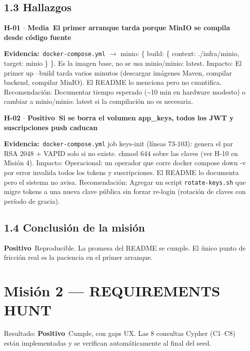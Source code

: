 \documentclass[10pt,a4paper]{article}
\newcommand{\code}[1]{\nolinkurl{#1}}
\newcommand{\badgeMedia}{\colorbox{yellow!35}{\textcolor{brown!90!black}{\textbf{\footnotesize Media}}}}
\newcommand{\badgePositivo}{\colorbox{green!20}{\textcolor{green!60!black}{\textbf{\footnotesize Positivo}}}}
\begin{document}
\subsection{1.3 Hallazgos}
\vspace{0.8em}\noindent\textbf{\large H-01 $\cdot$ \badgeMedia\  El primer arranque tarda porque MinIO se compila desde código fuente}\par\vspace{0.3em}
\noindent\textbf{Evidencia:}\ \code{docker-compose.yml} $\rightarrow$ minio: \{ build: \{ context: ./infra/minio, target: minio \} \}. Es la imagen base, no se usa minio/minio: latest.  Impacto: El primer up --build tarda varios minutos (descargar imágenes Maven, compilar backend, compilar MinIO). El README lo menciona pero no cuantifica.  Recomendación: Documentar tiempo esperado (\textasciitilde{}10 min en hardware modesto) o cambiar a minio/minio: latest si la compilación no es necesaria.\par\vspace{0.4em}
\vspace{0.8em}\noindent\textbf{\large H-02 $\cdot$ \badgePositivo\  Si se borra el volumen app\_keys, todos los JWT y suscripciones push caducan}\par\vspace{0.3em}
\noindent\textbf{Evidencia:}\ \code{docker-compose.yml} job keys-init (líneas 73-103): genera el par RSA 2048 + VAPID solo si no existe. chmod 644 sobre las claves (ver H-10 en Misión 4).  Impacto: Operacional: un operador que corre docker compose down -v por error invalida todos los tokens y suscripciones. El README lo documenta pero el sistema no avisa.  Recomendación: Agregar un script \code{rotate-keys.sh} que migre tokens a una nueva clave pública sin forzar re-login (rotación de claves con período de gracia).\par\vspace{0.4em}
\subsection{1.4 Conclusión de la misión}
\badgePositivo\  Reproducible. La promesa del README se cumple. El único punto de fricción real es la paciencia en el primer arranque.\par\vspace{0.4em}
\section{Misión 2 --- REQUIREMENTS HUNT}
Resultado: \badgePositivo\  Cumple, con gaps UX. Las 8 consultas Cypher (C1--C8) están implementadas y se verifican automáticamente al final del seed.\par\vspace{0.4em}
\end{document}
